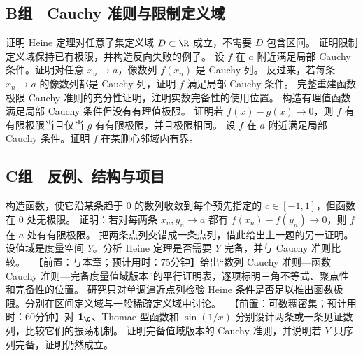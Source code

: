 \subsection*{B组　Cauchy 准则与限制定义域}
\begin{enumerate}[label=\textbf{15.\arabic*.},resume]
  \mustdo 证明 Heine 定理对任意子集定义域 \(D\subset\R\) 成立，不需要 \(D\) 包含区间。
  \mustdo 证明限制定义域保持已有极限，并构造反向失败的例子。
  \mustdo 设 \(f\) 在 \(a\) 附近满足局部 Cauchy 条件。证明对任意 \(x_n\to a\)，像数列 \(f(x_n)\) 是 Cauchy 列。
  \mustdo 反过来，若每条 \(x_n\to a\) 的像数列都是 Cauchy 列，证明 \(f\) 满足局部 Cauchy 条件。
  \mustdo 完整重建函数极限 Cauchy 准则的充分性证明，注明实数完备性的使用位置。
  \mustdo 构造有理值函数满足局部 Cauchy 条件但没有有理值极限。
  \mustdo 证明若 \(f(x)-g(x)\to0\)，则 \(f\) 有有限极限当且仅当 \(g\) 有有限极限，并且极限相同。
  \mustdo 设 \(f\) 在 \(a\) 附近满足局部 Cauchy 条件。证明 \(f\) 在某删心邻域内有界。
\end{enumerate}

\subsection*{C组　反例、结构与项目}
\begin{enumerate}[label=\textbf{15.\arabic*.},resume]
  \mustdo 构造函数，使它沿某条趋于 \(0\) 的数列收敛到每个预先指定的 \(c\in[-1,1]\)，但函数在 \(0\) 处无极限。
  \mustdo 证明：若对每两条 \(x_n,y_n\to a\) 都有 \(f(x_n)-f(y_n)\to0\)，则 \(f\) 在 \(a\) 处有有限极限。
  \optionaldo 把两条点列交错成一条点列，借此给出上一题的另一证明。
  \optionaldo 设值域是度量空间 \(Y\)。分析 Heine 定理是否需要 \(Y\) 完备，并与 Cauchy 准则比较。
  \projectdo\ 【前置：与本章；预计用时：75分钟】给出“数列 Cauchy 准则—函数 Cauchy 准则—完备度量值域版本”的平行证明表，逐项标明三角不等式、聚点性和完备性的位置。
  \opendo 研究只对单调逼近点列检验 Heine 条件是否足以推出函数极限。分别在区间定义域与一般稀疏定义域中讨论。
  \projectdo\ 【前置：可数稠密集；预计用时：60分钟】对 \(\mathbf1_{\Q}\)、Thomae 型函数和 \(\sin(1/x)\) 分别设计两条或一条见证数列，比较它们的振荡机制。
  \optionaldo 证明完备值域版本的 Cauchy 准则，并说明若 \(Y\) 只序列完备，证明仍然成立。
\end{enumerate}
